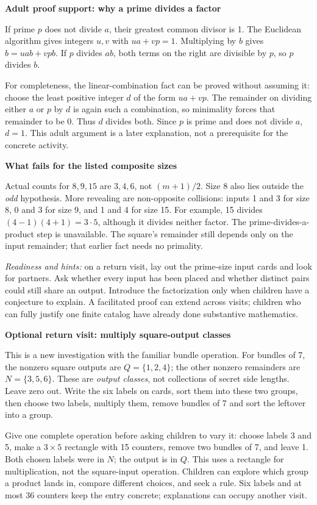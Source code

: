 \documentclass[11pt]{article}
\newcommand{\head}[1]{\par\textbf{\large #1}\par}
\newcommand{\sub}[1]{\par\textbf{#1}\par}
\begin{document}
\sub{Adult proof support: why a prime divides a factor}
If prime $p$ does not divide $a$, their greatest common divisor is 1. The Euclidean algorithm gives integers $u,v$ with $ua+vp=1$. Multiplying by $b$ gives $b=uab+vpb$. If $p$ divides $ab$, both terms on the right are divisible by $p$, so $p$ divides $b$.

For completeness, the linear-combination fact can be proved without assuming it: choose the least positive integer $d$ of the form $ua+vp$. The remainder on dividing either $a$ or $p$ by $d$ is again such a combination, so minimality forces that remainder to be 0. Thus $d$ divides both. Since $p$ is prime and does not divide $a$, $d=1$. This adult argument is a later explanation, not a prerequisite for the concrete activity.

\sub{What fails for the listed composite sizes}
Actual counts for $8,9,15$ are $3,4,6$, not $(m+1)/2$. Size 8 also lies outside the \emph{odd} hypothesis. More revealing are non-opposite collisions: inputs 1 and 3 for size 8, 0 and 3 for size 9, and 1 and 4 for size 15. For example, 15 divides $(4-1)(4+1)=3\cdot5$, although it divides neither factor. The prime-divides-a-product step is unavailable. The square's remainder still depends only on the input remainder; that earlier fact needs no primality.

\emph{Readiness and hints:} on a return visit, lay out the prime-size input cards and look for partners. Ask whether every input has been placed and whether distinct pairs could still share an output. Introduce the factorization only when children have a conjecture to explain. A facilitated proof can extend across visits; children who can fully justify one finite catalog have already done substantive mathematics.
\newpage
\head{Optional return visit: multiply square-output classes}
This is a new investigation with the familiar bundle operation. For bundles of 7, the nonzero square outputs are $Q=\{1,2,4\}$; the other nonzero remainders are $N=\{3,5,6\}$. These are \emph{output classes}, not collections of secret side lengths. Leave zero out. Write the six labels on cards, sort them into these two groups, then choose two labels, multiply them, remove bundles of 7 and sort the leftover into a group.

Give one complete operation before asking children to vary it: choose labels 3 and 5, make a $3\times5$ rectangle with 15 counters, remove two bundles of 7, and leave 1. Both chosen labels were in $N$; the output is in $Q$. This uses a rectangle for multiplication, not the square-input operation. Children can explore which group a product lands in, compare different choices, and seek a rule. Six labels and at most 36 counters keep the entry concrete; explanations can occupy another visit.
\end{document}
